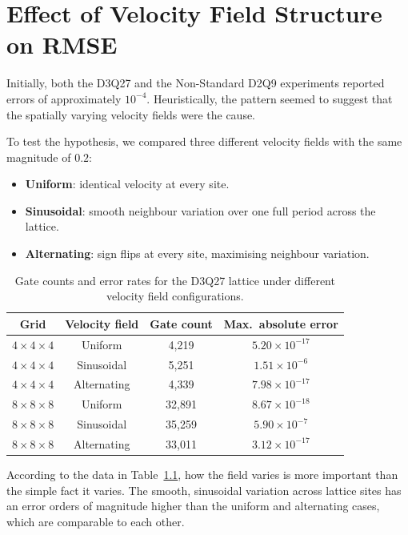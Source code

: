 \chapter{Effect of Velocity Field Structure on RMSE}
\label{app:rmse_analysis}

Initially, both the D3Q27 and the Non-Standard D2Q9 experiments reported errors of approximately $10^{-4}$.
Heuristically, the pattern seemed to suggest that the spatially varying velocity fields were the cause.

To test the hypothesis, we compared three different velocity fields with the same magnitude of $0.2$:
\begin{itemize}
    \item \textbf{Uniform}: identical velocity at every site.
    \item \textbf{Sinusoidal}: smooth neighbour variation over one full period across the lattice.
    \item \textbf{Alternating}: sign flips at every site, maximising neighbour variation.
\end{itemize}

\begin{table}[H]
\centering
\begin{tabular}{cccc}
\toprule
Grid & Velocity field & Gate count & Max.\ absolute error \\
\midrule
$4\times4\times4$ & Uniform     &  4{,}219 & $5.20 \times 10^{-17}$ \\
$4\times4\times4$ & Sinusoidal  &  5{,}251 & $1.51 \times 10^{-6}$ \\
$4\times4\times4$ & Alternating &  4{,}339 & $7.98 \times 10^{-17}$ \\
\midrule
$8\times8\times8$ & Uniform     & 32{,}891 & $8.67 \times 10^{-18}$ \\
$8\times8\times8$ & Sinusoidal  & 35{,}259 & $5.90 \times 10^{-7}$ \\
$8\times8\times8$ & Alternating & 33{,}011 & $3.12 \times 10^{-17}$ \\
\bottomrule
\end{tabular}
\caption{Gate counts and error rates for the D3Q27 lattice under different velocity field configurations.}
\label{tab:collision_vf}
\end{table}

According to the data in Table~\ref{tab:collision_vf}, how the field varies is more important than the simple fact it varies.
The smooth, sinusoidal variation across lattice sites has an error orders of magnitude higher than the uniform and alternating cases, which are comparable to each other.

